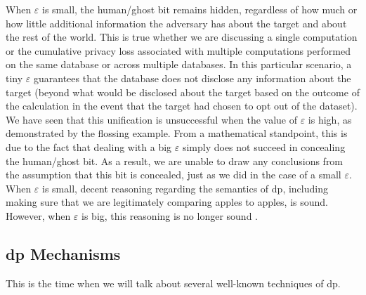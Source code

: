 When $\varepsilon$ is small, the human/ghost bit remains hidden, regardless of how much or how little additional information the adversary has about the target and about the rest of the world. This is true whether we are discussing a single computation or the cumulative privacy loss associated with multiple computations performed on the same database or across multiple databases. In this particular scenario, a tiny $\varepsilon$ guarantees that the database does not disclose any information about the target (beyond what would be disclosed about the target based on the outcome of the calculation in the event that the target had chosen to opt out of the dataset). We have seen that this unification is unsuccessful when the value of $\varepsilon$ is high, as demonstrated by the flossing example. From a mathematical standpoint, this is due to the fact that dealing with a big $\varepsilon$ simply does not succeed in concealing the human/ghost bit. As a result, we are unable to draw any conclusions from the assumption that this bit is concealed, just as we did in the case of a small $\varepsilon$. When $\varepsilon$ is small, decent reasoning regarding the semantics of \acrshort{dp}, including making sure that we are legitimately comparing apples to apples, is sound. However, when $\varepsilon$ is big, this reasoning is no longer sound \cite{DWORK2019}.

\subsection{\acrshort{dp} Mechanisms}

This is the time when we will talk about several well-known techniques of \acrshort{dp}.


